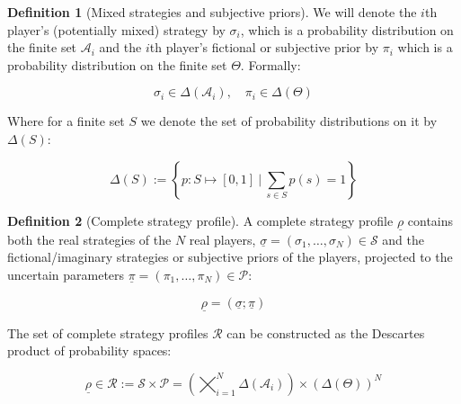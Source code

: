 \documentclass{article}
\theoremstyle{definition}
\newtheorem{definition}{Definition}[section]
\begin{document}
\begin{definition}[Mixed strategies and subjective priors]
We will denote the $i$th player's (potentially mixed) strategy by $\sigma_i$, which is a probability distribution on the finite set $\mathcal{A}_i$ and the $i$th player's fictional or subjective prior by $\pi_i$ which is a probability distribution on the finite set $\Theta$. Formally:

    \begin{equation}
        \sigma_i \in \Delta(\mathcal{A}_i), \quad \pi_i \in \Delta(\Theta)
    \end{equation}
\end{definition}

Where for a finite set $S$ we denote the set of probability distributions on it by $\Delta(S)$:

\begin{equation}
    \Delta(S) := \left \{p: S \mapsto [0,1] \ \bigg | \ \sum_{s \in S} p(s) = 1 \right \}
\end{equation}

\begin{definition}[Complete strategy profile]
A complete strategy profile $\underline{\rho}$ contains both the real strategies of the $N$ real players, $\underline{\sigma} = (\sigma_1,\dots,\sigma_N) \in \mathcal{S}$ and the fictional/imaginary strategies or subjective priors of the players, projected to the uncertain parameters $\underline{\pi}=(\pi_1,\dots,\pi_N) \in \mathcal{P}$:

    \begin{equation}
        \underline{\rho} = ( \underline{\sigma}; \underline{\pi} )
    \end{equation}

The set of complete strategy profiles $\mathcal{R}$ can be constructed as the Descartes product of probability spaces:
    
    \begin{equation}
        \underline{\rho} \in 
        \mathcal{R} :=
        \mathcal{S} \times \mathcal{P} =
        \left ( \bigtimes_{i=1}^N \Delta(\mathcal{A}_i) \right ) \times
        \left ( \Delta(\Theta) \right )^N
    \end{equation}

\end{definition}
\end{document}
